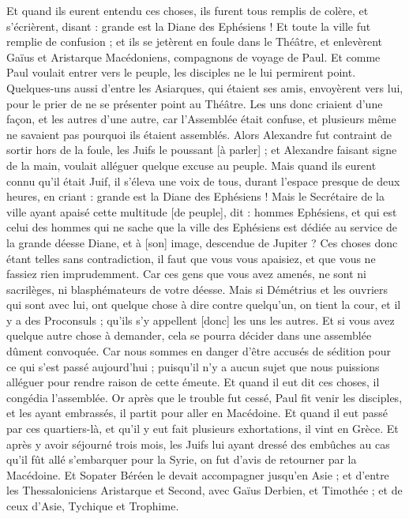 \begin{multicols}{2}
Et quand ils eurent entendu ces choses, ils furent tous remplis de colère, et s'écrièrent, disant : grande est la Diane des Ephésiens !
Et toute la ville fut remplie de confusion ; et ils se jetèrent en foule dans le Théâtre, et enlevèrent Gaïus et Aristarque Macédoniens, compagnons de voyage de Paul.
Et comme Paul voulait entrer vers le peuple, les disciples ne le lui permirent point.
Quelques-uns aussi d'entre les Asiarques, qui étaient ses amis, envoyèrent vers lui, pour le prier de ne se présenter point au Théâtre.
Les uns donc criaient d'une façon, et les autres d'une autre, car l'Assemblée était confuse, et plusieurs même ne savaient pas pourquoi ils étaient assemblés.
Alors Alexandre fut contraint de sortir hors de la foule, les Juifs le poussant [à parler] ; et Alexandre faisant signe de la main, voulait alléguer quelque excuse au peuple.
Mais quand ils eurent connu qu'il était Juif, il s'éleva une voix de tous, durant l'espace presque de deux heures, en criant : grande est la Diane des Ephésiens !
Mais le Secrétaire de la ville ayant apaisé cette multitude [de peuple], dit : hommes Ephésiens, et qui est celui des hommes qui ne sache que la ville des Ephésiens est dédiée au service de la grande déesse Diane, et à [son] image, descendue de Jupiter ?
Ces choses donc étant telles sans contradiction, il faut que vous vous apaisiez, et que vous ne fassiez rien imprudemment.
Car ces gens que vous avez amenés, ne sont ni sacrilèges, ni blasphémateurs de votre déesse.
Mais si Démétrius et les ouvriers qui sont avec lui, ont quelque chose à dire contre quelqu'un, on tient la cour, et il y a des Proconsuls ; qu'ils s'y appellent [donc] les uns les autres.
Et si vous avez quelque autre chose à demander, cela se pourra décider dans une assemblée dûment convoquée.
Car nous sommes en danger d'être accusés de sédition pour ce qui s'est passé aujourd'hui ; puisqu'il n'y a aucun sujet que nous puissions alléguer pour rendre raison de cette émeute. Et quand il eut dit ces choses, il congédia l'assemblée.
\VerseOne{}Or après que le trouble fut cessé, Paul fit venir les disciples, et les ayant embrassés, il partit pour aller en Macédoine.
Et quand il eut passé par ces quartiers-là, et qu'il y eut fait plusieurs exhortations, il vint en Grèce.
Et après y avoir séjourné trois mois, les Juifs lui ayant dressé des embûches au cas qu'il fût allé s'embarquer pour la Syrie, on fut d'avis de retourner par la Macédoine.
Et Sopater Béréen le devait accompagner jusqu'en Asie ; et d'entre les Thessaloniciens Aristarque et Second, avec Gaïus Derbien, et Timothée ; et de ceux d'Asie, Tychique et Trophime.

\end{multicols}
